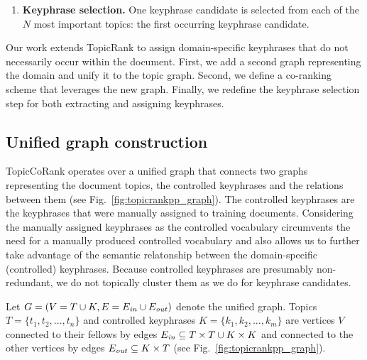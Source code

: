 \begin{enumerate}
{                \vspace{-1em}\begin{align}
                    S(t_i) = (1 - \lambda) + \lambda \sum_{t_j \in E(t_i)}{\frac{w_{ij}S(t_j)}{\mathlarger\sum_{t_k \in E(t_j)}{w_{jk}}}}\label{math:singlerank}
                \end{align}
            }
            \item{\textbf{Keyphrase selection.}
                One keyphrase candidate is selected from each of the $N$ most important topics: the first occurring keyphrase candidate.
            }
        \end{enumerate}
        
    Our work extends TopicRank to assign domain-specific keyphrases that do not necessarily occur within the document.
    First, we add a second graph representing the domain and unify it to the topic graph.
    Second, we define a co-ranking scheme that leverages the new graph.
    Finally, we redefine the keyphrase selection step for both extracting and assigning keyphrases.

    \subsection{Unified graph construction}
    \label{subsec:graph_construction}
        TopicCoRank operates over a unified graph that connects two graphs representing the document topics, the controlled keyphrases and the relations between them (see Fig.~\ref{fig:topicrankpp_graph}).
        The controlled keyphrases are the keyphrases that were manually assigned to training documents.
        Considering the manually assigned keyphrases as the controlled vocabulary circumvents the need for a manually produced controlled vocabulary and also allows us to further take advantage of the semantic relatonship between the domain-specific (controlled) keyphrases.
        Because controlled keyphrases are presumably non-redundant, we do not topically cluster them as we do for keyphrase candidates.
        
        
    
        Let $G = (V=T \cup K, E=E_{\textnormal{\textit{in}}} \cup E_{\textnormal{\textit{out}}})$ denote the unified graph.
        Topics $T=\{t_1, t_2, ..., t_n\}$ and controlled keyphrases $K=\{k_1, k_2, ..., k_m\}$ are vertices $V$ connected to their fellows by edges $E_\textnormal{\textit{in}} \subseteq T \times T \cup K \times K$ and connected to the other vertices by edges $E_\textnormal{\textit{out}} \subseteq K \times T$ (see Fig.~\ref{fig:topicrankpp_graph}).


